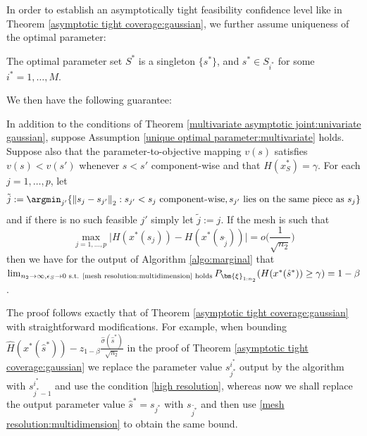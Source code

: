 \documentclass[mnsc,blindrev]{informs4} %
\newcommand{\norm}[1]{\left \Vert #1 \right\Vert}
\begin{document}
In order to establish an asymptotically tight feasibility confidence level like in Theorem \ref{asymptotic tight coverage:gaussian}, we further assume uniqueness of the optimal parameter:
\begin{assumption}\label{unique optimal parameter:multivariate}
The optimal parameter set $S^*$ is a singleton $\{s^*\}$, and $s^*\in S_{i^*}$ for some $i^*=1,\ldots,M$.
\end{assumption}
We then have the following guarantee:
\begin{theorem}\label{asymptotic tight coverage:gaussian multidimensional}
In addition to the conditions of Theorem \ref{multivariate asymptotic joint:univariate gaussian}, suppose Assumption \ref{unique optimal parameter:multivariate} holds. Suppose also that the parameter-to-objective mapping $v(s)$ satisfies $v(s)<v(s')$ whenever $s<s'$ component-wise and that $H(x_S^*)=\gamma$. For each $j=1,\ldots,p$, let
\begin{equation*}
\tilde j:=\argmin_{j'}\{\norm{s_j-s_{j'}}_2:s_{j'}<s_j\text{ component-wise},s_{j'}\text{ lies on the same piece as }s_j\}
\end{equation*}
and if there is no such feasible $j'$ simply let $\tilde j:=j$. If the mesh is such that
\begin{equation}\label{mesh resolution:multidimension}
\max_{j=1,\ldots,p}\lvert H(x^*(s_j))-H(x^*(s_{\tilde j}))\rvert=o\big(\frac{1}{\sqrt{n_2}}\big)
\end{equation}
then we have for the output of Algorithm \ref{algo:marginal} that $\lim_{n_2\to\infty,\epsilon_S\to 0\text{ s.t. \eqref{mesh resolution:multidimension} holds}}P_{\bm{\xi}_{1:n_2}}(H(x^*(\hat s^*))\geq \gamma)= 1-\beta$.
\end{theorem}
The proof follows exactly that of Theorem \ref{asymptotic tight coverage:gaussian} with straightforward modifications. For example, when bounding $\hat H(x^*(\hat s^*))-z_{1-\beta}\frac{\hat\sigma(\hat s^*)}{\sqrt{n_2}}$ in the proof of Theorem \ref{asymptotic tight coverage:gaussian} we replace the parameter value $s^{i^*}_{j^*}$ output by the algorithm with $s^{i^*}_{j^*-1}$ and use the condition \eqref{high resolution}, whereas now we shall replace the output parameter value $\hat s^*=s_{j^*}$ with $s_{\tilde{j^*}}$ and then use \eqref{mesh resolution:multidimension} to obtain the same bound.\hfill\Halmos
\end{document}
